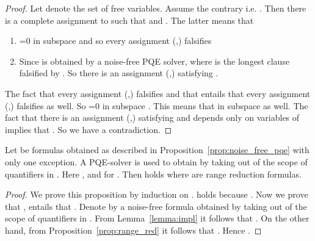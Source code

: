 \begin{proof}
Let  denote the set of free variables. Assume the contrary
i.e. .  Then there is a complete assignment  to
 such that  and . The latter means
that 
\begin{enumerate}
\item {}=0 in subspace  and so every
assignment (,) falsifies 
\item Since  is obtained by a noise-free PQE solver,
 where  is the longest clause falsified by .
So there is an assignment (,) satisfying .
\end{enumerate}

The fact that every assignment (,) falsifies  and that  entails that every assignment
(,) falsifies  as
well. So =0 in subspace . This means that
 in subspace  as well. The fact that
there is an assignment (,) satisfying  and 
depends only on variables of  implies that .
So we have a contradiction.
\end{proof}
\begin{proposition}
Let  be formulas obtained as described in
Proposition~\ref{prop:noise_free_pqe} with only one exception. A 
PQE-solver is used to obtain  by taking  out of the
scope of quantifiers in .
Here ,  and  for .
Then  holds where  are range
reduction formulas.
\end{proposition}
\begin{proof}
We prove this proposition by induction on . 
 holds because .
Now we prove that ,  entails that
. Denote by  a noise-free formula
obtained by taking  out of the scope of quantifiers
in . From
Lemma~\ref{lemma:impl} it follows that . On the
other hand, from Proposition~\ref{prop:range_red} it follows that
. Hence .
\end{proof}

